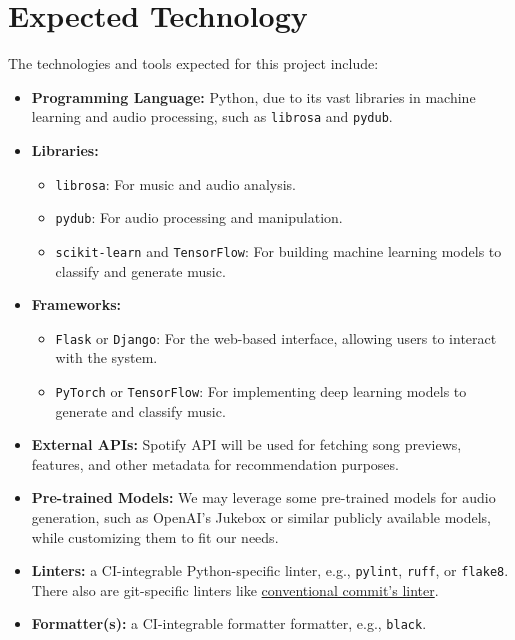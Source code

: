 \documentclass{article}
\begin{document}
\section{Expected Technology}

The technologies and tools expected for this project include:

\begin{itemize}
    \item \textbf{Programming Language:} Python, due to its vast libraries in machine learning and audio processing, such as \texttt{librosa} and \texttt{pydub}.
    \item \textbf{Libraries:} 
        \begin{itemize}
            \item \texttt{librosa}: For music and audio analysis.
            \item \texttt{pydub}: For audio processing and manipulation.
            \item \texttt{scikit-learn} and \texttt{TensorFlow}: For building machine learning models to classify and generate music.
        \end{itemize}
    \item \textbf{Frameworks:} 
        \begin{itemize}
            \item \texttt{Flask} or \texttt{Django}: For the web-based interface, allowing users to interact with the system.
            \item \texttt{PyTorch} or \texttt{TensorFlow}: For implementing deep learning models to generate and classify music.
        \end{itemize}
    \item \textbf{External APIs:} Spotify API will be used for fetching song previews, features, and other metadata for recommendation purposes.
    \item \textbf{Pre-trained Models:} We may leverage some pre-trained models for audio generation, such as OpenAI's Jukebox or similar publicly available models, while customizing them to fit our needs.
    \item \textbf{Linters:} a CI-integrable Python-specific linter, e.g., \texttt{pylint}, \texttt{ruff}, or \texttt{flake8}. There also are git-specific linters like \href{https://github.com/conventional-changelog/commitlint/tree/master/%40commitlint/config-conventional}{conventional commit's linter}.
    \item \textbf{Formatter(s):} a CI-integrable formatter formatter, e.g., \texttt{black}.

\end{itemize}
\end{document}
